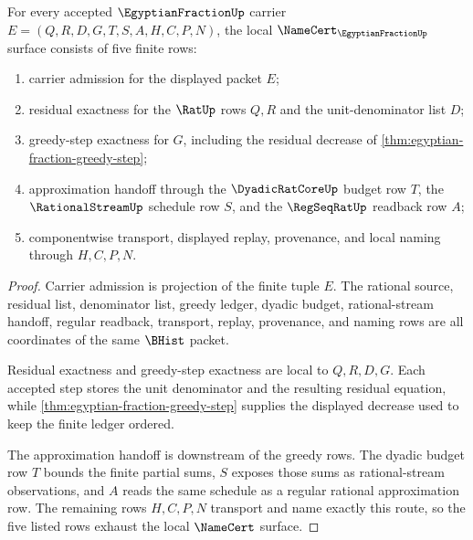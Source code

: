 \begin{theorem}
\label{thm:egyptian-fraction-namecert-obligations}
For every accepted $\EgyptianFractionUp$ carrier $E=(Q,R,D,G,T,S,A,H,C,P,N)$, the local $\NameCert_{\EgyptianFractionUp}$ surface consists of five finite rows:
\begin{enumerate}
\item carrier admission for the displayed packet $E$;
\item residual exactness for the $\RatUp$ rows $Q,R$ and the unit-denominator list $D$;
\item greedy-step exactness for $G$, including the residual decrease of \autoref{thm:egyptian-fraction-greedy-step};
\item approximation handoff through the $\DyadicRatCoreUp$ budget row $T$, the $\RationalStreamUp$ schedule row $S$, and the $\RegSeqRatUp$ readback row $A$;
\item componentwise transport, displayed replay, provenance, and local naming through $H,C,P,N$.
\end{enumerate}
\end{theorem}
\begin{proof}
Carrier admission is projection of the finite tuple $E$. The rational source, residual list, denominator list, greedy ledger, dyadic budget, rational-stream handoff, regular readback, transport, replay, provenance, and naming rows are all coordinates of the same $\BHist$ packet.

Residual exactness and greedy-step exactness are local to $Q,R,D,G$. Each accepted step stores the unit denominator and the resulting residual equation, while \autoref{thm:egyptian-fraction-greedy-step} supplies the displayed decrease used to keep the finite ledger ordered.

The approximation handoff is downstream of the greedy rows. The dyadic budget row $T$ bounds the finite partial sums, $S$ exposes those sums as rational-stream observations, and $A$ reads the same schedule as a regular rational approximation row. The remaining rows $H,C,P,N$ transport and name exactly this route, so the five listed rows exhaust the local $\NameCert$ surface.
\end{proof}


